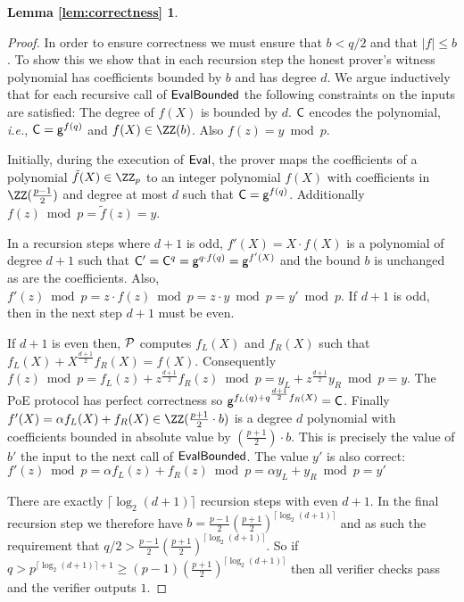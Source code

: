 \newtheorem*{lemmacorrectness}{Lemma \ref{lem:correctness}}
\begin{lemmacorrectness}
	\correctnesslemma
\end{lemmacorrectness}

\begin{proof}
In order to ensure correctness we must ensure that $b< q/2$ and that $|f|\leq b$. To show this we show that in each recursion step the honest prover's witness polynomial has coefficients bounded by $b$ and has degree $d$. 
We argue inductively that for each recursive call of $\textsf{{EvalBounded}}$ the following constraints on the inputs are satisfied: The degree of $f(X)$ is bounded by $d$. $\mathsf{C}$ encodes the polynomial, \emph{i.e.}, $\mathsf{C}=\mathsf{g}^{f(q)}$ and $f(X)\in \ZZ(b)$. Also $f(z) = y\bmod p$.

Initially, during the execution of $\textsf{{Eval}}$, the prover maps the coefficients of a polynomial $\tilde{f}(X)\in \ZZ_p$ to an integer polynomial $f(X)$ with coefficients in $\ZZ(\frac{p-1}{2})$ and degree at most $d$ such that $\mathsf{C}=\mathsf{g}^{f(q)}$. Additionally $f(z)\bmod p=\tilde{f}(z)=y$.

 In a recursion steps where $d+1$ is odd, $f'(X)=X\cdot f(X)$ is a polynomial of degree $d+1$ such that $\mathsf{C}'=\mathsf{C}^q=\mathsf{g}^{q\cdot f(q)}=\mathsf{g}^{f'(X)}$ and the bound $b$ is unchanged as are the coefficients. Also, $f'(z)\bmod p = z \cdot f(z) \bmod p=z\cdot y\bmod p = y' \bmod p$. If $d+1$ is odd, then in the next step $d+1$ must be even.
 
 If $d+1$ is even then, $\mathcal{P}$ computes $f_L(X)$ and $f_R(X)$ such that $f_L(X)+X^{\frac{d+1}{2}} f_R(X)=f(X)$. Consequently $f(z) \bmod p=f_L(z)+ z^{\frac{d+1}{2}} f_R(z)\bmod p=y_L+z^{\frac{d+1}{2}}  y_R\bmod p =y$. The \textsf{PoE} protocol has perfect correctness so {$\mathsf{g}^{f_L(q)+q^{\frac{d+1}{2}} f_R(X)}=\mathsf{C}$}.
 Finally $f'(X)=\alpha f_L(X) + f_R(X)\in \ZZ(\frac{p+1}{2}\cdot b)$ is a degree $d$ polynomial with coefficients bounded in absolute value by $(\frac{p+1}{2})\cdot b$. This is precisely the value of $b'$ the input to the next call of $\textsf{{EvalBounded}}$. The value $y'$ is also correct:
$f'(z)\bmod p=\alpha f_L(z) +f_R(z) \bmod p= \alpha y_L +y_R\bmod p=y'$
 
 There are exactly $\lceil\log_2(d+1)\rceil$ recursion steps with even $d+1$. In the final recursion step we therefore have $b=\frac{p-1}{2}(\frac{p+1}{2})^{\lceil\log_2(d+1)\rceil}$ and as such the requirement that $q/2>\frac{p-1}{2}(\frac{p+1}{2})^{\lceil\log_2(d+1)\rceil}$. 
 So if $q>p^{\lceil\log_2(d+1)\rceil+1}\geq (p-1) (\frac{p+1}{2})^{\lceil \log_2(d+1)\rceil}$ then all verifier checks pass and the verifier outputs $1$.
\end{proof} 


